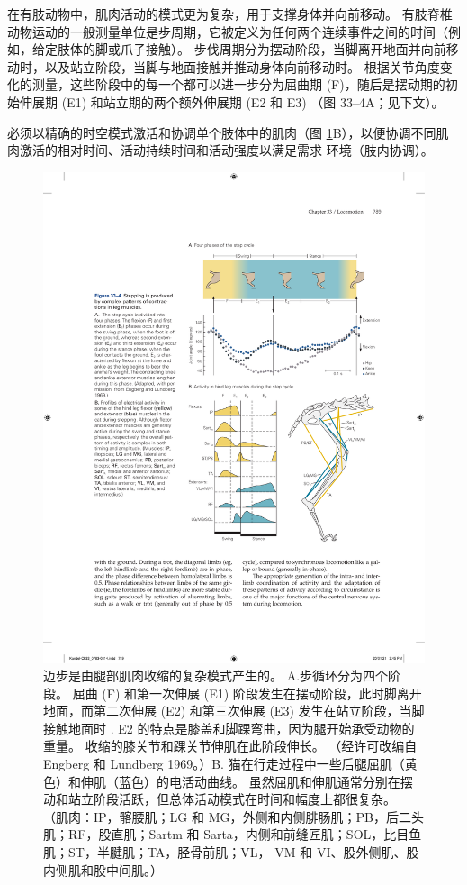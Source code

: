 在有肢动物中，肌肉活动的模式更为复杂，用于支撑身体并向前移动。 有肢脊椎动物运动的一般测量单位是步周期，它被定义为任何两个连续事件之间的时间（例如，给定肢体的脚或爪子接触）。 步伐周期分为摆动阶段，当脚离开地面并向前移动时，以及站立阶段，当脚与地面接触并推动身体向前移动时。 根据关节角度变化的测量，这些阶段中的每一个都可以进一步分为屈曲期 (F)，随后是摆动期的初始伸展期 (E1) 和站立期的两个额外伸展期 (E2 和 E3) （图 33–4A；见下文）。

必须以精确的时空模式激活和协调单个肢体中的肌肉（图 \ref{fig:33_4}B），以便协调不同肌肉激活的相对时间、活动持续时间和活动强度以满足需求 环境（肢内协调）。


\begin{figure}[htbp]
	\centering
	\includegraphics[width=0.65\linewidth]{chap33/fig_33_4}
	\caption{迈步是由腿部肌肉收缩的复杂模式产生的。 A.步循环分为四个阶段。 屈曲 (F) 和第一次伸展 (E1) 阶段发生在摆动阶段，此时脚离开地面，而第二次伸展 (E2) 和第三次伸展 (E3) 发生在站立阶段，当脚接触地面时 . E2 的特点是膝盖和脚踝弯曲，因为腿开始承受动物的重量。 收缩的膝关节和踝关节伸肌在此阶段伸长。 （经许可改编自 Engberg 和 Lundberg 1969。）B. 猫在行走过程中一些后腿屈肌（黄色）和伸肌（蓝色）的电活动曲线。 虽然屈肌和伸肌通常分别在摆动和站立阶段活跃，但总体活动模式在时间和幅度上都很复杂。 （肌肉：IP，髂腰肌；LG 和 MG，外侧和内侧腓肠肌；PB，后二头肌；RF，股直肌；Sartm 和 Sarta，内侧和前缝匠肌；SOL，比目鱼肌；ST，半腱肌；TA，胫骨前肌；VL， VM 和 VI、股外侧肌、股内侧肌和股中间肌。）}
	\label{fig:33_4}
\end{figure}


